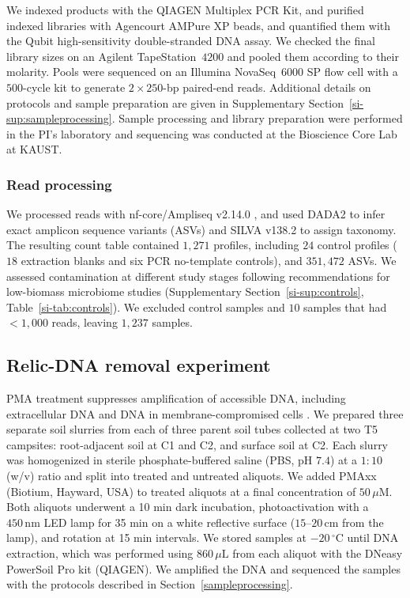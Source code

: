 \documentclass[fleqn,10pt,numbers]{olplainarticle}
\begin{document}
We indexed products with the QIAGEN Multiplex PCR Kit, and purified indexed libraries with Agencourt AMPure XP beads, and quantified them with the Qubit high-sensitivity double-stranded DNA assay. We checked the final library sizes on an Agilent TapeStation~$4200$ and pooled them according to their molarity. Pools were sequenced on an Illumina NovaSeq~$6000$ SP flow cell with a $500$-cycle kit to generate $2\times250$-bp paired-end reads. Additional details on protocols and sample preparation are given in Supplementary Section~\ref{si-sup:sampleprocessing}. Sample processing and library preparation were performed in the PI's laboratory and sequencing was conducted at the Bioscience Core Lab at KAUST.


\subsubsection*{Read processing}\label{sec:reads_methods}
We processed reads with nf-core/Ampliseq v2.14.0 \cite{nfcore, ampliseq}, and used DADA2 to infer exact amplicon sequence variants (ASVs) and SILVA v138.2 \cite{silva} to assign taxonomy. The resulting count table contained $1{,}271$ profiles, including $24$ control profiles ($18$ extraction blanks and six PCR no-template controls), and $351{,}472$ ASVs. We assessed contamination at different study stages following recommendations for low-biomass microbiome studies \cite{fierer2025controls} (Supplementary Section~\ref{si-sup:controls}, Table~\ref{si-tab:controls}). We excluded control samples and $10$ samples that had $<1{,}000$ reads, leaving $1{,}237$ samples.

\subsection*{Relic-DNA removal experiment}
PMA treatment suppresses amplification of accessible DNA, including extracellular DNA and DNA in membrane-compromised cells \cite{wang2021pma,sun2023,carini2017relic}. We prepared three separate soil slurries from each of three parent soil tubes collected at two T5 campsites: root-adjacent soil at C1 and C2, and surface soil at C2. Each slurry was homogenized in sterile phosphate-buffered saline (PBS, pH $7.4$) at a $1:10$ (w/v) ratio and split into treated and untreated aliquots. We added PMAxx (Biotium, Hayward, USA) to treated aliquots at a final concentration of $50\,\mu\mathrm{M}$. Both aliquots underwent a 10 min dark incubation, photoactivation with a $450\,\mathrm{nm}$ LED lamp for 35 min on a white reflective surface ($15$--$20\,\mathrm{cm}$ from the lamp), and rotation at 15 min intervals. We stored samples at $-20\,^{\circ}\mathrm{C}$ until DNA extraction, which was performed using $860\,\mu\mathrm{L}$ from each aliquot with the DNeasy PowerSoil Pro kit (QIAGEN). We amplified the DNA and sequenced the samples with the protocols described in Section~\ref{sampleprocessing}.
\end{document}
